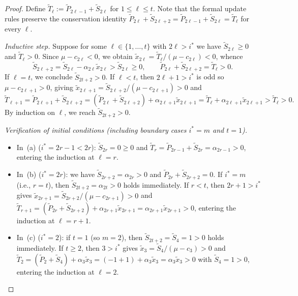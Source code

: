 \documentclass[11pt,a4paper]{article}
\theoremstyle{definition}
\begin{document}
\begin{proof}
  Define $\tilde{T}_\ell := \tilde{P}_{2\ell-1} + \tilde{S}_{2\ell}$ for $1 \le \ell \le t$. Note that the formal update rules preserve the conservation identity $\tilde{P}_{2\ell} + \tilde{S}_{2\ell+2} = \tilde{P}_{2\ell-1} + \tilde{S}_{2\ell} = \tilde{T}_\ell$ for every $\ell$.

  \emph{Inductive step.} Suppose for some $\ell \in \{1,\dots,t\}$ with $2\ell > i^*$ we have $\tilde{S}_{2\ell} \ge 0$ and $\tilde{T}_\ell > 0$. Since $\mu - c_{2\ell} < 0$, we obtain $\tilde{x}_{2\ell} = \tilde{T}_\ell / (\mu - c_{2\ell}) < 0$, whence
  \[
    \tilde{S}_{2\ell+2} = \tilde{S}_{2\ell} - \alpha_{2\ell}\tilde{x}_{2\ell} > \tilde{S}_{2\ell} \ge 0, \qquad
    \tilde{P}_{2\ell} + \tilde{S}_{2\ell+2} = \tilde{T}_\ell > 0.
  \]
  If $\ell = t$, we conclude $\tilde{S}_{2t+2} > 0$. If $\ell < t$, then $2\ell + 1 > i^*$ is odd so $\mu - c_{2\ell+1} > 0$, giving $\tilde{x}_{2\ell+1} = \tilde{S}_{2\ell+2} / (\mu - c_{2\ell+1}) > 0$ and
  \[
    \tilde{T}_{\ell+1} = \tilde{P}_{2\ell+1} + \tilde{S}_{2\ell+2} = (\tilde{P}_{2\ell} + \tilde{S}_{2\ell+2}) + \alpha_{2\ell+1}\tilde{x}_{2\ell+1} = \tilde{T}_\ell + \alpha_{2\ell+1}\tilde{x}_{2\ell+1} > \tilde{T}_\ell > 0.
  \]
  By induction on $\ell$, we reach $\tilde{S}_{2t+2} > 0$.

  \emph{Verification of initial conditions (including boundary cases $i^* = m$ and $t = 1$).}
  \begin{itemize}
    \item In~(a) ($i^* = 2r - 1 < 2r$): $\tilde{S}_{2r} = 0 \ge 0$ and $\tilde{T}_r = \tilde{P}_{2r-1} + \tilde{S}_{2r} = \alpha_{2r-1} > 0$, entering the induction at $\ell = r$.
    \item In~(b) ($i^* = 2r$): we have $\tilde{S}_{2r+2} = \alpha_{2r} > 0$ and $\tilde{P}_{2r} + \tilde{S}_{2r+2} = 0$. If $i^* = m$ (i.e., $r = t$), then $\tilde{S}_{2t+2} = \alpha_{2t} > 0$ holds immediately. If $r < t$, then $2r + 1 > i^*$ gives $\tilde{x}_{2r+1} = \tilde{S}_{2r+2}/(\mu - c_{2r+1}) > 0$ and $\tilde{T}_{r+1} = (\tilde{P}_{2r} + \tilde{S}_{2r+2}) + \alpha_{2r+1}\tilde{x}_{2r+1} = \alpha_{2r+1}\tilde{x}_{2r+1} > 0$, entering the induction at $\ell = r + 1$.
    \item In~(c) ($i^* = 2$): if $t = 1$ (so $m = 2$), then $\tilde{S}_{2t+2} = \tilde{S}_4 = 1 > 0$ holds immediately. If $t \ge 2$, then $3 > i^*$ gives $\tilde{x}_3 = \tilde{S}_4 / (\mu - c_3) > 0$ and $\tilde{T}_2 = (\tilde{P}_2 + \tilde{S}_4) + \alpha_3 \tilde{x}_3 = (-1 + 1) + \alpha_3 \tilde{x}_3 = \alpha_3 \tilde{x}_3 > 0$ with $\tilde{S}_4 = 1 > 0$, entering the induction at $\ell = 2$. \qedhere
  \end{itemize}
\end{proof}
\end{document}
